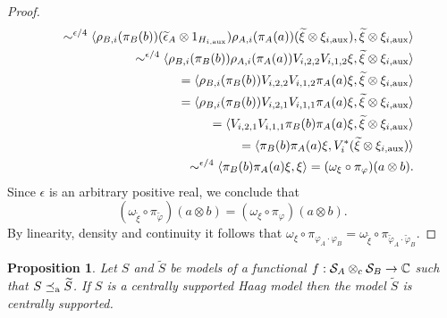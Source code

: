 \documentclass[11pt]{amsart}
\newtheorem{proposition}[theorem]{Proposition}
\theoremstyle{definition}
\newcommand{\cl}[1]{\mathcal{#1}}
\providecommand{\wt}[1]{\widetilde{#1}}
\begin{document}
\begin{proof}
\begin{eqnarray*}
    && \sim^{\epsilon/4}
    \langle \rho_{B,i}(\pi_B(b))
    (\wt{\epsilon}_A\otimes 1_{H_{i,{\rm aux}}})\rho_{A,i}(\pi_A(a))
    (\wt{\xi}\otimes\xi_{i,{\rm aux}}), 
    \wt{\xi}\otimes\xi_{i,{\rm aux}}\rangle\\
    && \sim^{\epsilon/4}
    \langle \rho_{B,i}(\pi_B(b))\rho_{A,i}(\pi_A(a))V_{i,2,2}V_{i,1,2}\xi, \wt{\xi}\otimes\xi_{i,{\rm aux}}\rangle\\
    && =
    \langle \rho_{B,i}(\pi_B(b))V_{i,2,2}V_{i,1,2}\pi_A(a)\xi, \wt{\xi}\otimes\xi_{i,{\rm aux}}\rangle\\
    && =
    \langle \rho_{B,i}(\pi_B(b))V_{i,2,1}V_{i,1,1}\pi_A(a)\xi, \wt{\xi}\otimes\xi_{i,{\rm aux}}\rangle\\
    && =
    \langle V_{i,2,1}V_{i,1,1} \pi_B(b)\pi_A(a)\xi, \wt{\xi}\otimes\xi_{i,{\rm aux}}\rangle\\
    && = 
    \langle \pi_B(b)\pi_A(a)\xi, V_i^*(\wt{\xi}\otimes\xi_{i,{\rm aux}})\rangle\\
    && \sim^{\epsilon/4}
    \langle \pi_B(b)\pi_A(a)\xi, \xi\rangle
    = 
    (\omega_\xi\circ\pi_\varphi)(a\otimes b).
    \end{eqnarray*}
Since $\epsilon$ is an arbitrary positive real, we conclude that 
$$(\omega_{\wt{\xi}}\circ\pi_{\wt{\varphi}})(a\otimes b) = (\omega_\xi\circ\pi_\varphi)(a\otimes b).$$
By linearity, density and continuity it follows that $\omega_\xi\circ\pi_{\varphi_A\cdot\varphi_B}
 = \omega_{\wt{\xi}}\circ\pi_{\wt{\varphi}_A\cdot\wt{\varphi}_B}$.
\end{proof}





\begin{proposition}\label{p_Haagn}
Let $S$ and $\wt{S}$ be models of a functional $f : \cl S_A\otimes_{\rm c}\cl S_B\to\mathbb{C}$
such that $S\preceq_{\rm a}\wt{S}$. If $S$ is a centrally supported Haag model then 
the model $\wt{S}$ is centrally supported. 
\end{proposition}
\end{document}
